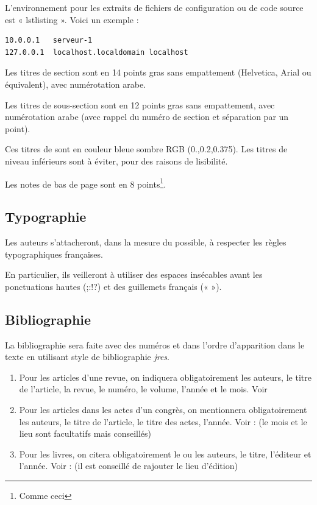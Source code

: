 \documentclass[city=Montpellier,year=2013]{jres}
\begin{document}
L'environnement pour les extraits de fichiers de configuration ou
de code source  est « lstlisting ». Voici un exemple :

\begin{lstlisting}
10.0.0.1   serveur-1
127.0.0.1  localhost.localdomain localhost
\end{lstlisting}

Les titres de section sont en 14 points gras sans empattement
(Helvetica, Arial ou équivalent), avec numérotation arabe.

Les titres de sous-section sont en 12 points gras sans empattement,
avec numérotation arabe (avec rappel du numéro de section et
séparation par un point).

Ces titres de sont en couleur bleue sombre RGB (0.,0.2,0.375).  Les
titres de niveau inférieurs sont à éviter, pour des raisons de
lisibilité.

Les notes de bas de page sont en 8 points\footnote{Comme ceci}.

\subsection{Typographie}

Les auteurs s'attacheront, dans la mesure du possible, à respecter les
règles typographiques françaises.

En particulier, ils veilleront à utiliser des espaces insécables avant
les ponctuations hautes (;:!?) et des guillemets français (« »).

\subsection{Bibliographie}

La bibliographie sera faite avec des numéros et dans l'ordre
d'apparition dans le texte en utilisant style de bibliographie
\emph{jres}.

\begin{enumerate}

\item Pour les articles d'une revue, on indiquera obligatoirement les
  auteurs, le titre de l'article, la revue, le numéro, le volume,
  l'année et le mois. Voir \cite{exemple1}

\item Pour les articles dans les actes d'un congrès, on mentionnera
  obligatoirement les auteurs, le titre de l'article, le titre des
  actes, l'année. Voir : \cite{exemple2} (le mois et le lieu sont
  facultatifs mais conseillés)

\item Pour les livres, on citera obligatoirement le ou les auteurs, le
  titre, l'éditeur et l'année. Voir : \cite{exemple3} (il est conseillé de
  rajouter le lieu d'édition)

\end{enumerate}
\end{document}
